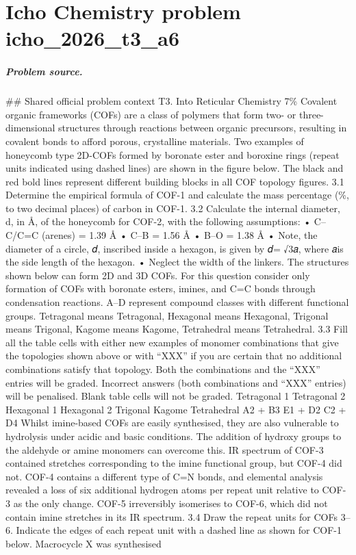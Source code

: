 
\chapter{Icho Chemistry problem icho\_2026\_t3\_a6}
\label{ch:IChO2026Problems_problem_icho_2026_t3_a6}

\paragraph{Problem source.}
\#\# Shared official problem context
T3. Into Reticular Chemistry 7\% Covalent organic frameworks (COFs) are a class of polymers that form two- or three-dimensional structures through reactions between organic precursors, resulting in covalent bonds to afford porous, crystalline materials. Two examples of honeycomb type 2D-COFs formed by boronate ester and boroxine rings (repeat units indicated using dashed lines) are shown in the figure below. The black and red bold lines represent different building blocks in all COF topology figures. 3.1 Determine the empirical formula of COF-1 and calculate the mass percentage (\%, to two decimal places) of carbon in COF-1. 3.2 Calculate the internal diameter, d, in Å, of the honeycomb for COF-2, with the following assumptions: • C–C/C=C (arenes) = 1.39 Å • C–B = 1.56 Å • B–O = 1.38 Å • Note, the diameter of a circle, 𝑑, inscribed inside a hexagon, is given by 𝑑= √3𝑎, where 𝑎is the side length of the hexagon. • Neglect the width of the linkers. The structures shown below can form 2D and 3D COFs. For this question consider only formation of COFs with boronate esters, imines, and C=C bonds through condensation reactions. A–D represent compound classes with different functional groups. Tetragonal means Tetragonal, Hexagonal means Hexagonal, Trigonal means Trigonal, Kagome means Kagome, Tetrahedral means Tetrahedral. 3.3 Fill all the table cells with either new examples of monomer combinations that give the topologies shown above or with “XXX” if you are certain that no additional combinations satisfy that topology. Both the combinations and the “XXX” entries will be graded. Incorrect answers (both combinations and “XXX” entries) will be penalised. Blank table cells will not be graded. Tetragonal 1 Tetragonal 2 Hexagonal 1 Hexagonal 2 Trigonal Kagome Tetrahedral A2 + B3 E1 + D2 C2 + D4 Whilst imine-based COFs are easily synthesised, they are also vulnerable to hydrolysis under acidic and basic conditions. The addition of hydroxy groups to the aldehyde or amine monomers can overcome this. IR spectrum of COF-3 contained stretches corresponding to the imine functional group, but COF-4 did not. COF-4 contains a different type of C=N bonds, and elemental analysis revealed a loss of six additional hydrogen atoms per repeat unit relative to COF-3 as the only change. COF-5 irreversibly isomerises to COF-6, which did not contain imine stretches in its IR spectrum. 3.4 Draw the repeat units for COFs 3–6. Indicate the edges of each repeat unit with a dashed line as shown for COF-1 below. Macrocycle X was synthesised 